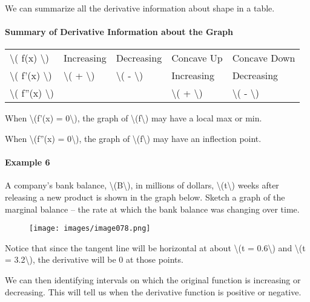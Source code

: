 We can summarize all the derivative information about shape in a table.

\hypertarget{summary-of-derivative-information-about-the-graph}{%
\paragraph{Summary of Derivative Information about the
Graph}\label{summary-of-derivative-information-about-the-graph}}

\begin{longtable}[]{@{}lllll@{}}
\toprule
\endhead
\textbackslash{}( f(x) \textbackslash{}) & Increasing & Decreasing &
Concave Up & Concave Down\tabularnewline
\textbackslash{}( f'(x) \textbackslash{}) & \textbackslash{}( +
\textbackslash{}) & \textbackslash{}( - \textbackslash{}) & Increasing &
Decreasing\tabularnewline
\textbackslash{}( f''(x) \textbackslash{}) & & & \textbackslash{}( +
\textbackslash{}) & \textbackslash{}( - \textbackslash{})\tabularnewline
\bottomrule
\end{longtable}

When \textbackslash{}(f'(x) = 0\textbackslash{}), the graph of
\textbackslash{}(f\textbackslash{}) may have a local max or min.

When \textbackslash{}(f''(x) = 0\textbackslash{}), the graph of
\textbackslash{}(f\textbackslash{}) may have an inflection point.

\hypertarget{example-6}{%
\paragraph{Example 6}\label{example-6}}

A company's bank balance, \textbackslash{}(B\textbackslash{}), in
millions of dollars, \textbackslash{}(t\textbackslash{}) weeks after
releasing a new product is shown in the graph below. Sketch a graph of
the marginal balance -- the rate at which the bank balance was changing
over time.

\begin{figure}
\centering
\texttt{[image: images/image078.png]}
\caption{}
\end{figure}

Notice that since the tangent line will be horizontal at about
\textbackslash{}(t = 0.6\textbackslash{}) and \textbackslash{}(t =
3.2\textbackslash{}), the derivative will be 0 at those points.

We can then identifying intervals on which the original function is
increasing or decreasing. This will tell us when the derivative function
is positive or negative.


